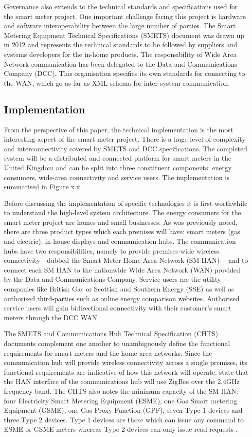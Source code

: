       Governance also extends to the technical standards and specifications used for the smart meter project. One important challenge facing this project is hardware and software interoperability between the large number of parties. The Smart Metering Equipment Technical Specifications (SMETS) document was drawn up in 2012 and represents the technical standards to be followed by suppliers and systems developers for the in-home products. The responsibility of Wide Area Network communication has been delegated to the Data and Communications Company (DCC). This organisation specifies its own standards for connecting to the WAN, which go as far as XML schema for inter-system communication.

    \subsection{Implementation}
      From the perspective of this paper, the technical implementation is the most interesting aspect of the smart meter project. There is a huge level of complexity and interconnectivity covered by SMETS and DCC specifications. The completed system will be a distributed and connected platform for smart meters in the United Kingdom and can be split into three constituent components: energy consumers, wide-area connectivity and service users. The implementation is summarised in Figure x.x.

      Before discussing the implementation of specific technologies it is first worthwhile to understand the high-level system architecture. The energy consumers for the smart meter project are homes and small businesses. As was previously noted, there are three product types which each premises will have: smart meters (gas and electric), in-house displays and communication hubs. The communication hubs have two responsibilities, namely to provide premises-wide wireless connectivity---dubbed the Smart Meter Home Area Network (SM HAN)--- and to connect each SM HAN to the nationwide Wide Area Network (WAN) provided by the Data and Communications Company. Service users are the utility companies like British Gas or Scottish and Southern Energy (SSE) as well as authorised third-parties such as online energy comparison websites. Authorised service users will gain bidirectional connectivity with their customer's smart meters through the DCC WAN.

      The SMETS and Communications Hub Technical Specification (CHTS) documents complement one another to unambiguously define the functional requirements for smart meters and the home area networks. Since the communication hub will provide wireless connectivity across a single premises, its functional requirements are indicative of how this network will operate. \citet{chts:2014} state that the HAN interface of the communications hub will use ZigBee over the 2.4GHz frequency band. The CHTS also notes the minimum capacity of the SM HAN: four Electricity Smart Metering Equipment (ESME), one Gas Smart metering Equipment (GSME), one Gas Proxy Function (GPF), seven Type 1 devices and three Type 2 devices. Type 1 devices are those which can issue any command to ESME or GSME meters whereas Type 2 devices can only issue read requests \citep{EnergyUtilities:2014}.

